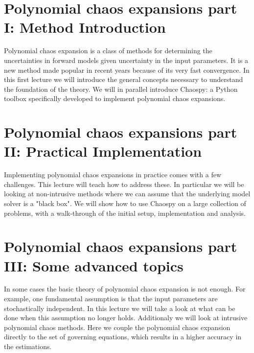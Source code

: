 \documentclass[a4paper,10pt]{article}
\begin{document}
\section{Polynomial chaos expansions part I: Method Introduction}

Polynomial chaos expansion is a class of methods for determining the
uncertainties in forward models given uncertainty in the input parameters.
It is a new method made popular in recent years because of
its very fast convergence.
In this first lecture we will introduce the
general concepts necessary to understand the foundation of the theory.
We will in parallel introduce Chaospy: a Python
toolbox specifically developed to implement polynomial chaos
expansions.

\section{Polynomial chaos expansions part II: Practical Implementation}

Implementing polynomial chaos expansions in practice comes with a
few challenges. This lecture will teach how to address these.
In particular we will be looking at non-intrusive methods where we
can assume that the underlying model solver is a "black box".
We will show how to use Chaospy on a large collection of problems,
with a walk-through of the initial setup, implementation and analysis.

\section{Polynomial chaos expansions part III: Some advanced topics}

In some cases the basic theory of polynomial chaos expansion is not
enough.
For example, one fundamental assumption is that the
input parameters are stochastically independent.
In this lecture we will take a look at what
can be done when this assumption no longer holds.
Additionaly we will look at intrusive polynomial chaos
methods.
Here we couple the polynomial chaos expansion directly to
the set of governing equations, which results in a higher accuracy in
the estimations.
\end{document}

